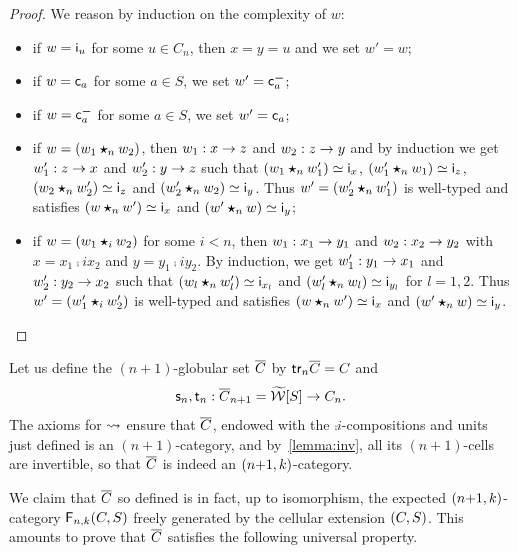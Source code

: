   \begin{proof}
    We reason by induction on the complexity of $w$:
    \begin{itemize}
    \item if $w=\mathsf{i}_{u}$ for some $u\in C_n$, then $x=y=u$ and we set
      $w'=w$;
    \item if $w=\mathsf{c}_{a}$ for some $a\in S$, we set $w'=\mathsf{c}^{\boldsymbol{-}}_{a}$;
    \item if $w=\mathsf{c}^{\boldsymbol{-}}_{a}$ for some $a\in S$, we set $w'=\mathsf{c}_{a}$;
     \item if $w=(w_1\bm{\star}_{n} w_2)$, then $w_1:x\to z$ and
       $w_2:z\to y$ and by induction we get $w'_1:z\to x$ and
       $w'_2:y\to z$ such that $(w_1\bm{\star}_{n} w'_1)\simeq \mathsf{i}_{x}$,
       $(w'_1\bm{\star}_{n} w_1)\simeq \mathsf{i}_{z}$, $(w_2\bm{\star}_{n} w'_2)\simeq \mathsf{i}_{z}$
       and $(w'_2\bm{\star}_{n} w_2)\simeq \mathsf{i}_{y}$. Thus $w'=(w'_2\bm{\star}_{n}
       w'_1)$ is well-typed and satisfies $(w\bm{\star}_{n} w')\simeq \mathsf{i}_{x}$
       and $(w'\bm{\star}_{n} w)\simeq \mathsf{i}_{y}$;
       \item if $w=(w_1\bm{\star}_{i} w_2)$ for some $i<n$, then
         $w_1:x_1\to y_1$
         and $w_2:x_2\to y_2$ with $x=x_1\comp i x_2$ and
         $y=y_1\comp i y_2$. By induction, we get
         $w'_1:y_1\to x_1$ and $w'_2:y_2\to x_2$ such that
         $(w_l\bm{\star}_{n} w'_l)\simeq \mathsf{i}_{x_l}$ and $(w'_l\bm{\star}_{n}
         w_l)\simeq \mathsf{i}_{y_l}$ for $l=1,2$. Thus $w'=(w'_1\bm{\star}_{i}
         w'_2)$ is well-typed and satisfies $(w\bm{\star}_{n} w')\simeq \mathsf{i}_{x}$
       and $(w'\bm{\star}_{n} w)\simeq \mathsf{i}_{y}$.
    \end{itemize}
  \end{proof}
  Let us define the $(n{+}1)$-globular set $\overline{C}$ by
  $\mathsf{tr}_{n}\overline{C}=C$ and \[\mathsf{s}_{n},\mathsf{t}_{n}:\overline{C}_{n+1}=\widetilde{\mathcal{W}}[S]\to C_n.\]
  The axioms for $\leadsto$ ensure that $\overline{C}$, endowed with
  the $\comp i$-compositions and units just defined is an
  $(n{+}1)$-category, and by~\cref{lemma:inv}, all its $(n{+}1)$-cells
  are invertible, so that $\overline{C}$ is
  indeed an
  $(n{+}1,k)$-category.
 

  We claim that $\overline{C}$ so defined is
  in fact, up to isomorphism, the expected $(n{+}1,k)$-category
  $\mathsf{F}_{n,k}(C,S)$ freely generated by the cellular extension $(C,S)$.
  This amounts to prove that $\overline{C}$ satisfies the following universal property.
  
